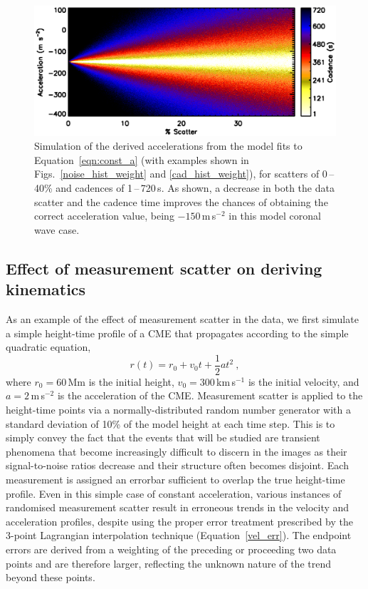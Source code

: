\documentclass[structabstract]{aa}
\begin{document}
\begin{figure}[!b]
\begin{center}
\includegraphics[scale=0.53, trim=20 10 0 20]{images/fig_noise_cad.eps}
\caption{Simulation of the derived accelerations from the model fits to Equation~\ref{eqn:const_a} (with examples shown in Figs.~\ref{noise_hist_weight} and \ref{cad_hist_weight}), for scatters of 0\,--\,40\% and cadences of 1\,--\,720\,s. As shown, a decrease in both the data scatter and the cadence time improves the chances of obtaining the correct acceleration value, being $-150$\,m\,s$^{-2}$ in this model coronal wave case.}
\label{noise_test_image}
\end{center}
\end{figure}

\subsection{Effect of measurement scatter on deriving kinematics}
\label{subsect:noise}

As an example of the effect of measurement scatter in the data, we first simulate a simple height-time profile of a CME that propagates according to the simple quadratic equation,
\begin{equation}
\label{eqn:const_a}
r(t) = r_0 + v_0 t + \frac{1}{2}a t^2 \ ,
\end{equation}
where $r_0=60$\,Mm is the initial height, $v_0=300$\,km\,s$^{-1}$ is the initial velocity, and $a=2$\,m\,s$^{-2}$ is the acceleration of the CME. Measurement scatter is applied to the height-time points via a normally-distributed random number generator with a standard deviation of 10\% of the model height at each time step. This is to simply convey the fact that the events that will be studied are transient phenomena that become increasingly difficult to discern in the images as their signal-to-noise ratios decrease and their structure often becomes disjoint. Each measurement is assigned an errorbar sufficient to overlap the true height-time profile. Even in this simple case of constant acceleration, various instances of randomised measurement scatter result in erroneous trends in the velocity and acceleration profiles, despite using the proper error treatment prescribed by the 3-point Lagrangian interpolation technique (Equation~\ref{vel_err}). The endpoint errors are derived from a weighting of the preceding or proceeding two data points and are therefore larger, reflecting the unknown nature of the trend beyond these points.
\end{document}
